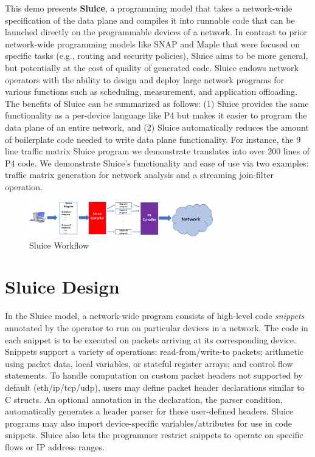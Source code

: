 This demo presents \textbf{Sluice}, a programming model that takes a
network-wide specification of the data plane and compiles it into runnable code
that can be launched directly on the programmable devices of a network. In
contrast to prior network-wide programming models like SNAP and Maple that were
focused on specific tasks (e.g., routing and security policies), Sluice aims to
be more general, but potentially at the cost of quality of generated code.
Sluice endows network operators with the ability to design and deploy large
network programs for various functions such as scheduling, measurement, and
application offloading.  The benefits of Sluice can be summarized as follows: (1) Sluice provides the same functionality as a per-device language like P4 but makes it easier to program the data plane of an entire network, and (2) Sluice automatically reduces the amount of boilerplate code needed to write data plane functionality. For instance, the 9 line traffic matrix Sluice program we demonstrate translates into over 200 lines of P4 code. We demonstrate Sluice's functionality and ease of use via two examples: traffic matrix generation for network analysis and a streaming join-filter operation.
\begin{figure}[tp]
\centering
\includegraphics[width=80mm,scale=0.7]{figures/sluice_workflow.pdf}
\caption{Sluice Workflow}
\vspace{-8mm}
\end{figure}
\vspace{-3mm}

\section{Sluice Design}
In the Sluice model, a network-wide program consists of high-level code
\textit{snippets} annotated by the operator to run on particular devices in a
network. The code in each snippet is to be executed on packets arriving at its
corresponding device. Snippets support a variety of operations:
read-from/write-to packets; arithmetic using packet data, local variables, or
stateful register arrays; and control flow statements. To handle computation on
custom packet headers not supported by default (eth/ip/tcp/udp), users may
define packet header declarations similar to C structs. An optional annotation
in the declaration, the parser condition, automatically generates a header
parser for these user-defined headers. Sluice programs may also import
device-specific variables/attributes for use in code snippets. Sluice also lets
the programmer restrict snippets to operate on specific flows or IP address
ranges.

